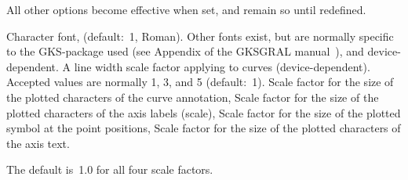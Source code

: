  
All other  options become effective when set,
and remain so until redefined.
\begin{mylist}
Character font, (default:~1, Roman). Other fonts exist, but are
normally specific to the GKS-package used
(see Appendix of the GKSGRAL manual~\cite{B-GKS}),
and device-dependent.
A line width scale factor applying to curves (device-dependent).
Accepted values are normally 1, 3, and 5 (default:~1).
Scale factor for the size of the plotted
characters of the curve annotation,
Scale factor for the size of the plotted
characters of the axis labels (scale),
Scale factor for the size of the plotted
symbol at the point positions,
Scale factor for the size of the plotted
characters of the axis text.
\end{mylist}
The default is~1.0 for all four scale factors.
 
